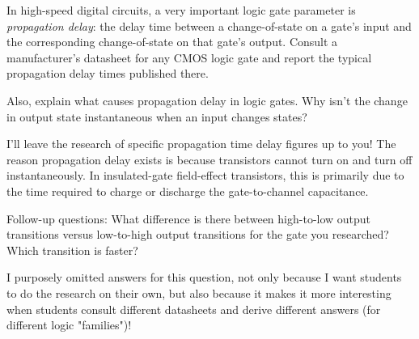 

In high-speed digital circuits, a very important logic gate parameter is {\it propagation delay}: the delay time between a change-of-state on a gate's input and the corresponding change-of-state on that gate's output.  Consult a manufacturer's datasheet for any CMOS logic gate and report the typical propagation delay times published there.

Also, explain what causes propagation delay in logic gates.  Why isn't the change in output state instantaneous when an input changes states?







I'll leave the research of specific propagation time delay figures up to you!  The reason propagation delay exists is because transistors cannot turn on and turn off instantaneously.  In insulated-gate field-effect transistors, this is primarily due to the time required to charge or discharge the gate-to-channel capacitance.

\vskip 10pt

Follow-up questions: What difference is there between high-to-low output transitions versus low-to-high output transitions for the gate you researched?  Which transition is faster?  







I purposely omitted answers for this question, not only because I want students to do the research on their own, but also because it makes it more interesting when students consult different datasheets and derive different answers (for different logic "families")!




